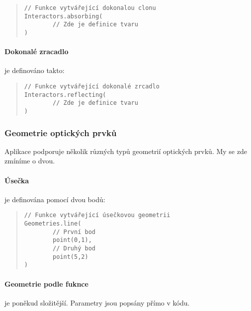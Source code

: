 \begin{minipage}{\textwidth}\begin{quote}\begin{lstlisting}
// Funkce vytvářející dokonalou clonu
Interactors.absorbing(
        // Zde je definice tvaru
)
\end{lstlisting}\end{quote}\end{minipage}
    

\paragraph{Dokonalé zracadlo} je definováno takto:

\begin{minipage}{\textwidth}\begin{quote}\begin{lstlisting}
// Funkce vytvářející dokonalé zrcadlo
Interactors.reflecting(
        // Zde je definice tvaru
)
\end{lstlisting}\end{quote}\end{minipage}


\subsubsection{Geometrie optických prvků}

Aplikace podporuje několik různých typů geometrií optických prvků. My se zde zmíníme o dvou.

\paragraph{Úsečka} je definována pomocí dvou bodů:

\begin{minipage}{\textwidth}\begin{quote}\begin{lstlisting}
// Funkce vytvářející úsečkovou geometrii
Geometries.line(
        // První bod
        point(0,1),
        // Druhý bod
        point(5,2)
)
\end{lstlisting}\end{quote}\end{minipage}



\paragraph{Geometrie podle fuknce} je poněkud složitější. Parametry jsou popsány přímo v kódu.


